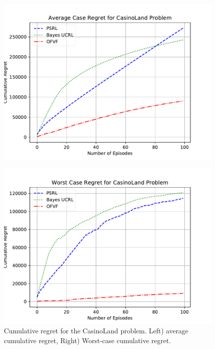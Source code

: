 \documentclass{article}
\theoremstyle{plain}
\theoremstyle{definition}
\begin{document}
\begin{figure}
	\centering
	\begin{minipage}[c]{.85\columnwidth}
		\centering
		\includegraphics[width=\linewidth]{fig/casino_land_averagecase_Bayes_PSRL_OFVF.pdf}\\
	\end{minipage}%
	\begin{minipage}[c]{.85\columnwidth}
		\centering
		\includegraphics[width=\linewidth]{fig/casino_land__worstcase_Bayes_PSRL_OFVF.pdf}
	\end{minipage}%
	\caption{Cumulative regret for the CasinoLand problem. Left) average cumulative regret, Right) Worst-case cumulative regret.}
	\label{fig:riverswim}
\end{figure}
\end{document}
